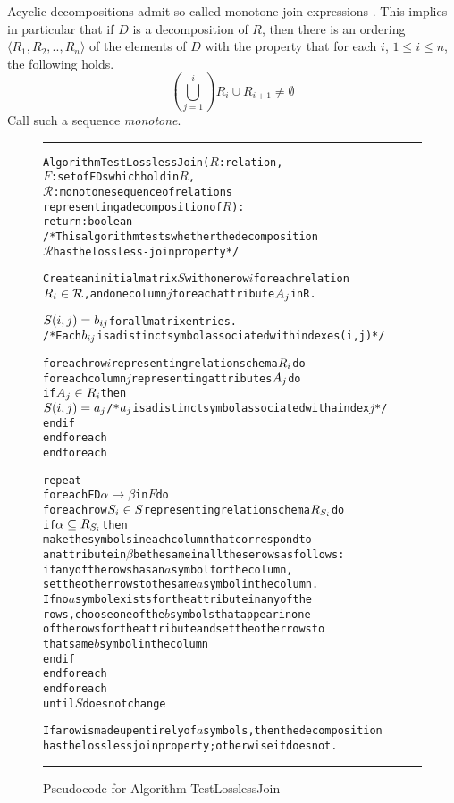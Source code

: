 Acyclic decompositions admit so-called monotone join expressions
\cite[Theorem 3.4]{BeeriFMY83}. This implies in particular that if
$D$ is a decomposition of $R$, then there is an ordering
 $\langle R_1,R_2,..,R_n \rangle$
of the elements of $D$ with the property that for each $i$,
 $1{}\leq{}i{}\leq{}n$, the following holds.
 \[
   (\bigcup_{j=1}^{i}) R_i \cup R_{i+1} \neq \emptyset
 \]
 Call such a sequence \emph{monotone}.


\begin{figure}[htbp]
\hrule
\begin{alltt}

Algorithm TestLosslessJoin(\(R\): relation,
              \(F\): set of FDs which hold in \(R\),
              \(\mathcal{R}\): monotone sequence of relations 
                  representing a decomposition of \(R\)):
        return: boolean
/* This algorithm tests whether the decomposition 
\(\mathcal{R}\) has the lossless-join property */
  
  Create an initial matrix \(S\) with one row \(i\) for each relation 
  \(R\sb{i} \in \mathcal{R}\), and one column \(j\) for each attribute \(A\sb{j}\) in R.  
  
   
  \(S(i, j) = b\sb{ij}\) for all matrix entries. 
  /* Each \(b\sb{ij}\) is a distinct symbol associated with indexes (i,j)*/
  
  foreach row \(i\) representing relation schema \(R\sb{i}\) do
    foreach column \(j\) representing attributes \(A\sb{j}\) do
      if \(A\sb{j} \in R\sb{i}\) then
        \(S(i, j) = a\sb{j}\) /* \(a\sb{j}\) is a distinct symbol associated with a index \(j\) */
      end if
    end foreach
  end foreach
  
  repeat
    foreach FD \(\alpha \rightarrow \beta\) in \(F\) do
      foreach row \(S\sb{i} \in S\) representing relation schema \(R\sb{S\sb{i}}\) do
        if \(\alpha \subseteq R\sb{S\sb{i}}\) then
          make the symbols in each column that correspond to
          an attribute in \(\beta\) be the same in all these rows as follows:
          if any of the rows has an \(a\) symbol for the column,
          set the other rows to the same \(a\) symbol in the column.
          If no \(a\) symbol exists for the attribute in any of the
          rows, choose one of the \(b\) symbols that appear in one
          of the rows for the attribute and set the other rows to
          that same \(b\) symbol in the column
        end if
      end foreach
    end foreach
  until \(S\) does not change
                  
If a row is made up entirely of \(a\) symbols, then the decomposition 
has the lossless join property; otherwise it does not.
\end{alltt}
\caption{Pseudocode for Algorithm TestLosslessJoin}\label{alg:lossless}
\hrule
\end{figure}


